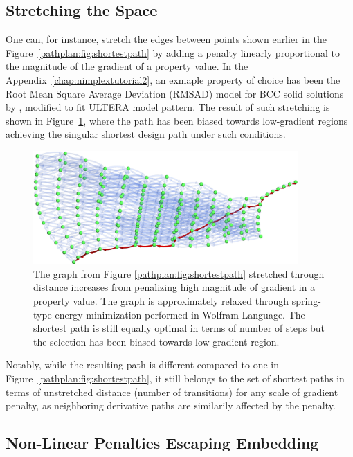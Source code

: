 \subsection{Stretching the Space} \label{pathplan:ssec:gradientstretch}

One can, for instance, stretch the edges between points shown earlier in the Figure~\ref{pathplan:fig:shortestpath} by adding a penalty linearly proportional to the magnitude of the gradient of a property value. In the Appendix~\ref{chap:nimplextutorial2}, an exmaple property of choice has been the Root Mean Square Average Deviation (RMSAD) model for BCC solid solutions by \citet{Tandoc2023MiningAlloys}, modified to fit ULTERA model pattern. The result of such stretching is shown in Figure~\ref{pathplan:fig:lowgradient}, where the path has been biased towards low-gradient regions achieving the singular shortest design path under such conditions. 

\begin{figure}[H]
    \centering
    \includegraphics[width=0.9\textwidth]{pathplanning/InfeasibilityGliding_LowGradient.png}
    \caption{The graph from Figure \ref{pathplan:fig:shortestpath} stretched through distance increases from penalizing high magnitude of gradient in a property value. The graph is approximately relaxed through spring-type energy minimization performed in Wolfram Language. The shortest path is still equally optimal in terms of number of steps but the selection has been biased towards low-gradient region.}
    \label{pathplan:fig:lowgradient}
\end{figure}

Notably, while the resulting path is different compared to one in Figure~\ref{pathplan:fig:shortestpath}, it still belongs to the set of shortest paths in terms of unstretched distance (number of transitions) for any scale of gradient penalty, as neighboring derivative paths are similarily affected by the penalty.

\subsection{Non-Linear Penalties Escaping Embedding} \label{pathplan:ssec:gradientsquare}


